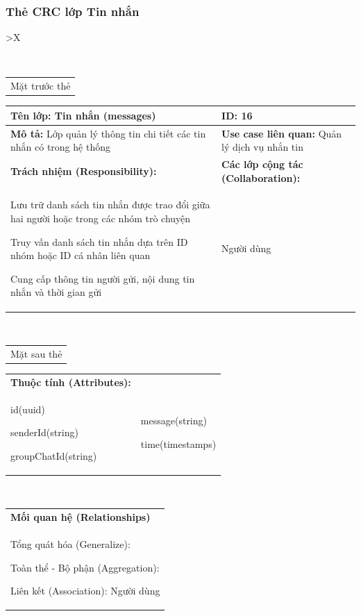 \subsubsection{Thẻ CRC lớp Tin nhắn}

\begin{xltabular}{\textwidth}{
		>{\centering\arraybackslash}X
	}
	\caption{\bfseries \fontsize{12pt}{0pt}\selectfont Thẻ CRC lớp Tin nhắn}
	\\
	\begin{tabularx}{0.9\textwidth}{X}
		Mặt trước thẻ
	\end{tabularx}
	\begin{tabularx}{0.9\textwidth}{|X|X|}
		\hline
		\textbf{Tên lớp:} Tin nhắn (messages)                                         & \textbf{ID:} 16                                        \\
		\hline
		\textbf{Mô tả:} Lớp quản lý thông tin chi tiết các tin nhắn có trong hệ thống & \textbf{Use case liên quan:}  Quản lý dịch vụ nhắn tin \\
		\hline
		\textbf{Trách nhiệm (Responsibility):}                                        & \textbf{Các lớp cộng tác (Collaboration):}             \\
		Lưu trữ danh sách tin nhắn được trao đổi giữa hai người hoặc trong các nhóm trò chuyện

		Truy vấn danh sách tin nhắn dựa trên ID nhóm hoặc ID cá nhân liên quan

		Cung cấp thông tin người gửi, nội dung tin nhắn và thời gian gửi
		                                                                              &
		Người dùng
		\\
		\hline
	\end{tabularx}
	\\
	\begin{tabularx}{0.9\textwidth}{X}
		Mặt sau thẻ
	\end{tabularx}
	\begin{tabularx}{0.9\textwidth}{|X|X|}
		\hline
		\textbf{Thuộc tính (Attributes):} & \\
		id(uuid)

		senderId(string)

		groupChatId(string)
		                                  &
		message(string)

		time(timestamps)
		\\ \hline
	\end{tabularx}
	\\
	\begin{tabularx}{0.9\textwidth}{|X|}
		\hline
		\textbf{Mối quan hệ (Relationships)} \\
		Tổng quát hóa (Generalize):

		Toàn thể - Bộ phận (Aggregation):

		Liên kết (Association): Người dùng
		\\
		\hline
	\end{tabularx}
\end{xltabular}


